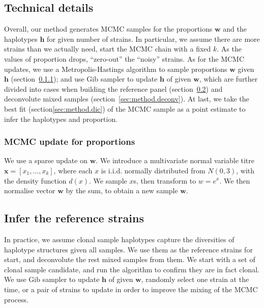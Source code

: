 \documentclass{bioinfo}
\begin{document}
\subsection{Technical details}
Overall, our method generates MCMC samples for the proportions $\mathbf w$ and the haplotypes $\mathbf h$ for given number of strains. In particular, we assume there are more strains than we actually need, start the MCMC chain with a fixed $k$. As the values of proportion drops, ``zero-out'' the ``noisy'' strains. As for the MCMC updates, we use a Metropolis-Hastings algorithm to sample proportions $\mathbf w$ given $\mathbf h$ (section~\ref{sec:updateP}); and use Gib sampler to update $\mathbf h$ of given $\mathbf w$, which are further divided into cases when building the reference panel (section~\ref{sec:method.ref}) and deconvolute mixed samples (section~\ref{sec:method.deconv}). At last, we take the best fit (section\ref{sec:method.dic}) of the MCMC sample as a point estimate to infer the haplotypes and proportion.

\subsubsection{MCMC update for proportions}\label{sec:updateP}
We use a sparse update on $\mathbf w$. We introduce a multivariate normal variable titre ${\mathbf x} = [x_1,\dots,x_k]$, where each $x$ is i.i.d. normally distributed from $N(0, 3)$, with the density function $d(x)$. We sample $x$s, then transform to $w = e^x$. We then normalise vector $\mathbf w$ by the sum, to obtain a new sample ${\mathbf w}$.




\subsection{Infer the reference strains}\label{sec:method.ref}
In practice, we assume clonal sample haplotypes capture the diversities of haplotype structures given all samples. We use them as the reference strains for start, and deconvolute the rest mixed samples from them. We start with a set of clonal sample candidate, and run the algorithm to confirm they are in fact clonal. We use Gib sampler to update $\mathbf h$ of given $\mathbf w$, randomly select one strain at the time, or a pair of strains to update in order to improve the mixing of the MCMC process.
\end{document}

